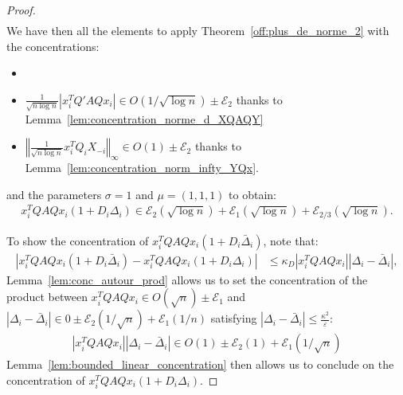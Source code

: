 \documentclass[a4papaer, titlepage]{book}
\begin{document}
\begin{proof}
\begin{align*}
   \end{align*}
   We have then all the elements to apply Theorem~\ref{off:plus_de_norme_2} with the concentrations:
   \begin{itemize}
     \item {}
     \item $\frac{1 }{\sqrt {n\log n}}\left\vert x_i^TQ'AQx_i \right\vert \in O(1/\sqrt{\log n}) \pm \mathcal E_2$ thanks to Lemma~\ref{lem:concentration_norme_d_XQAQY}
     \item $\left\Vert  \frac{1}{\sqrt {n\log n}}x_i^TQ_{i}X_{-i} \right\Vert_\infty \in O(1) \pm \mathcal E_2$ thanks to Lemma~\ref{lem:concentration_norm_infty_YQx}.
   \end{itemize}
   and the parameters $\sigma=1$ and $\mu = (1, 1,1)$ to obtain:
   \begin{align*}
     x_i^TQAQx_i (1+D_i \Delta_i) \in \mathcal E_2 \left(\sqrt{\log n}\right) +  \mathcal E_{1} \left(\sqrt{\log n}\right) +  \mathcal E_{2/3}(\sqrt{\log n}).
   \end{align*}

   To show the concentration of $x_i^TQAQx_i (1+D_i\bar \Delta_i)$, note that:
  \begin{align*}
    \left\vert x_i^TQAQx_i (1+D_i\bar \Delta_i) - x_i^TQAQx_i (1+D_i \Delta_i) \right\vert 
    &\leq \kappa_D \left\vert x_i^TQAQx_i \right\vert \left\vert \Delta_i - \bar \Delta_i \right\vert,
  \end{align*}
   Lemma~\ref{lem:conc_autour_prod} allows us to set the concentration of the product between $x_i^TQAQx_i \in O(\sqrt n) \pm \mathcal E_1$ and $\left\vert \Delta_i - \bar \Delta_i \right\vert \in 0 \pm \mathcal E_2(1/\sqrt {n}) + \mathcal E_1(1/n)$ satisfying $\left\vert \Delta_i - \bar \Delta_i \right\vert \leq \frac{\kappa^2}{\varepsilon}$:
   \begin{align*}
     \left\vert x_i^TQAQx_i \right\vert \left\vert \Delta_i - \bar \Delta_i \right\vert \in O(1) \pm \mathcal E_2(1) + \mathcal E_1(1/\sqrt n) 
   \end{align*}
  Lemma~\ref{lem:bounded_linear_concentration} then allows us to conclude on the concentration of $x_i^TQAQx_i (1+D_i \Delta_i)$.
 \end{proof}
\end{document}

